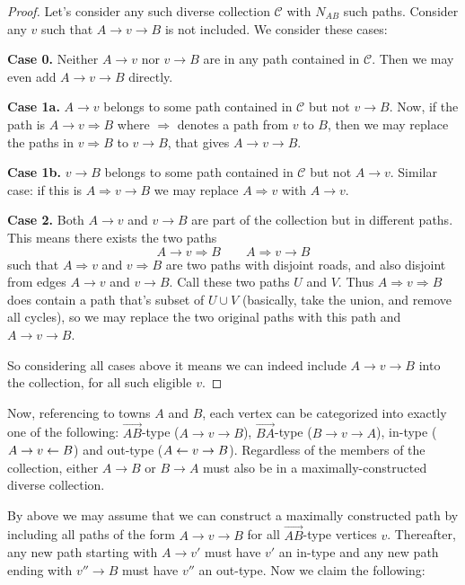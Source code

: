 \documentclass[11pt,a4paper]{article}
\begin{document}
\begin{enumerate}
		\begin{proof}
			Let's consider any such diverse collection $\mathcal{C}$ with $N_{AB}$ such paths. 
			Consider any $v$ such that $A\to v\to B$ is not included. We consider these cases: 
			
			\textbf{Case 0.} Neither $A\to v$ nor $v\to B$ are in any path contained in $\mathcal{C}$. 
			Then we may even add $A\to v\to B$ directly. 
			
			\textbf{Case 1a.} $A\to v$ belongs to some path contained in $\mathcal{C}$ but not $v\to B$. 
			Now, if the path is $A\to v\Rightarrow B$ where $\Rightarrow$ denotes a path from $v$ to $B$, then we may replace the paths in $v\Rightarrow B$ to $v\to B$, that gives $A\to v\to B$.  
			
			\textbf{Case 1b.} $v\to B$ belongs to some path contained in $\mathcal{C}$ but not $A\to v$. 
			Similar case: if this is $A\Rightarrow v\to B$ we may replace $A\Rightarrow v$ with $A\to v$. 
			
			\textbf{Case 2.} Both $A\to v$ and $v\to B$ are part of the collection but in different paths. 
			This means there exists the two paths 
			\[
			A\to v\Rightarrow B\qquad A\Rightarrow v\to B
			\]
			such that $A\Rightarrow v$ and $v\Rightarrow B$ are two paths with disjoint roads, and also disjoint from edges $A\to v$ and $v\to B$. 
			Call these two paths $U$ and $V$. 
			Thus $A\Rightarrow v\Rightarrow B$ does contain a path that's subset of $U\cup V$ (basically, take the union, and remove all cycles), 
			so we may replace the two original paths with this path and $A\to v\to B$. 
			
			So considering all cases above it means we can indeed include $A\to v\to B$ into the collection, for all such eligible $v$. 
		\end{proof}
	    
	    Now, referencing to towns $A$ and $B$, each vertex can be categorized into exactly one of the following: $\vec{AB}$-type ($A\to v\to B$), $\vec{BA}$-type ($B\to v\to A$), 
	    in-type ($A\to v\leftarrow B$) and out-type ($A\leftarrow v\to B$). 
	    Regardless of the members of the collection, either $A\to B$ or $B\to A$ must also be in a maximally-constructed diverse collection. 
	    
	    By above we may assume that we can construct a maximally constructed path by including all paths of the form $A\to v\to B$ for all $\vec{AB}$-type vertices $v$. 
	    Thereafter, any new path starting with $A\to v'$ must have $v'$ an in-type and any new path ending with $v''\to B$ must have $v''$ an out-type. 
	    Now we claim the following:
	    

\end{enumerate}
\end{document}
